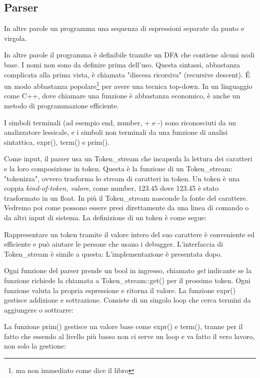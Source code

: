 \documentclass[11pt,a4paper]{book}
\begin{document}
\subsection{Parser}
\label{code: 128}
In altre parole un programma  una sequenza di espressioni separate da punto e virgola.

In altre parole il programma è definibile tramite un DFA che contiene alcuni nodi base. I nomi non sono da definire prima dell'uso.
Questa sintassi, abbastanza complicata alla prima vista, è chiamata "discesa ricorsiva" (recursive descent). É un modo abbastanza popolare\footnote{ma non immediato come dice il libro} per avere una tecnica top-down.
In un linguaggio come C++, dove chiamare una funzione è abbastanza economico, è anche un metodo di programmazione efficiente.

I simboli terminali (ad esempio end, number, + e -) sono riconosciuti da un analizzatore lessicale, e i simboli non terminali da una funzione di analisi sintattica, expr(), term() e prim(). 

Come input, il parser usa un Token\_stream che incapsula la lettura dei caratteri e la loro composizione in token. Questa è la funzione di un Token\_stream: "tokenizza", ovvero trasforma lo stream di caratteri in token. Un token è una coppia \emph{{kind-of-token, valore}}, come {number, 123.45} dove 123.45 è stato trasformato in un float. In più il Token\_stream nasconde la fonte del carattere. Vedremo poi come possono essere presi direttamente da una linea di comando o da altri input di sistema. La definizione di un token è come segue:
\label{code: 129}

Rappresentare un token tramite il valore intero del suo carattere è conveniente ed efficiente e può aiutare le persone che usano i debugger. L'interfaccia di Token\_stream è simile a questa:
\label{code: 130}
L'implementazione è presentata dopo.

Ogni funzione del parser prende un bool in ingresso, chiamato \emph{get} indicante se la funzione richiede la chiamata a Token\_stream::get() per il prossimo token. Ogni funzione valuta la propria espressione e ritorna il valore. La funzione expr() gestisce addizione e sottrazione. Consiste di un singolo loop che cerca termini da aggiungere o sottrarre:
\label{code: 131}

La funzione prim() gestisce un valore base come expr() e term(), tranne per il fatto che essendo al livello più basso non ci serve un loop e va fatto il vero lavoro, non solo la gestione:
\label{code: 132}
\end{document}
